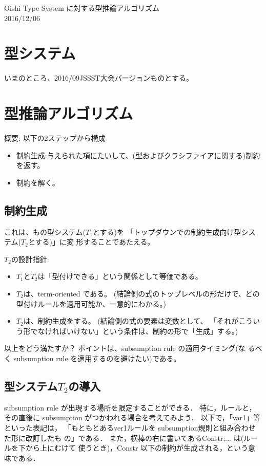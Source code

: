 \documentclass[dvipdfmx]{jsarticle}
\begin{document}
\begin{center}
  Oishi Type System に対する型推論アルゴリズム \\
  2016/12/06
\end{center}

\section{型システム}

いまのところ、2016/09JSSST大会バージョンものとする。

\section{型推論アルゴリズム}

概要: 以下の2ステップから構成
\begin{itemize}
\item 制約生成:与えられた項にたいして、(型およびクラシファイアに関する)制約を返す。
\item 制約を解く。
\end{itemize}

\subsection{制約生成}

これは、もの型システム($T_1$とする)を
「トップダウンでの制約生成向け型システム($T_2$とする)」に変
形することであたえる。

$T_2$の設計指針:
\begin{itemize}
\item $T_1$と$T_2$は「型付けできる」という関係として等価である。
\item $T_2$は、term-oriented である。
  (結論側の式のトップレベルの形だけで、どの型付けルールを適用可能か、一意的にわかる。)
\item $T_2$は、制約生成をする。
  (結論側の式の要素は変数として、
  「それがこういう形でなければいけない」という条件は、制約の形で「生成」する。)
\end{itemize}

以上をどう満たすか？ ポイントは、subsumption rule の適用タイミング(な
るべく subsumption rule を適用するのを避けたい)である。

\subsection{型システム$T_2$の導入}

subsumption rule が出現する場所を限定することができる．
特に，ルールと，その直後に subsumption がつかわれる場合を考えてみよう．
以下で，「var1」等といった表記は，
「もともとあるver1ルールを subsumption規則と組み合わせた形に改訂したも
の」である．
また，横棒の右に書いてあるConstr;... は(ルールを下から上にむけて
使うとき)，Constr 以下の制約が生成される，という意味である．
\end{document}
